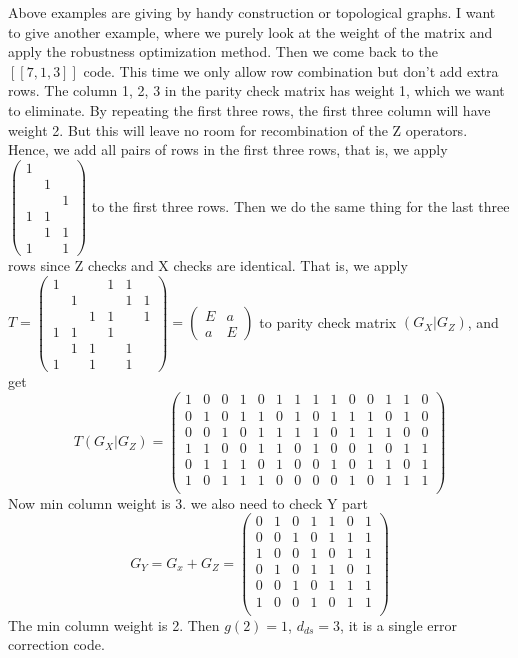 \documentclass[aps,prb,12pt,tightenlines,%
notitlepage,longbibliography]{revtex4-1}
\begin{document}
Above examples are giving by handy construction or topological graphs. I want to give another example, where we purely look at the weight of the matrix and apply the robustness optimization method. Then we come back to the $[[7,1,3]]$ code. This time we only allow row combination but  don't add extra rows. The column 1, 2, 3 in the parity check matrix has weight 1, which we want to eliminate. By repeating the first three rows, the first three column will have weight 2. But this will leave no room for recombination of the Z operators.
Hence, we add all pairs of rows in the first three rows, that is, we apply 
$\left( \begin{array}{ccc} 1\\&1\\&&1\\1&1\\&1&1\\1&&1 \end{array} \right)$ to the first three rows. Then we do the same thing for the last three rows since Z checks and X checks are identical. That is, we apply 
$T = \left( \begin{array}{ccc|ccc} 1&&&1&1\\&1&&&1&1\\&&1&1&&1\\1&1&&1\\&1&1&&1\\1&&1&&1 \end{array} \right) = \left( \begin{array}{cc} E & a \\a & E \end{array} \right)$ to parity check matrix $(G_X|G_Z)$, and get
$$T(G_X|G_Z)=\left(
\begin{array}{ccccccc|ccccccc}
1&0&0&1&0&1&1 &1&1&0&0&1&1&0\\
0&1&0&1&1&0&1 &0&1&1&1&0&1&0\\
0&0&1&0&1&1&1 &1&0&1&1&1&0&0\\
1&1&0&0&1&1&0 &1&0&0&1&0&1&1\\
0&1&1&1&0&1&0 &0&1&0&1&1&0&1\\
1&0&1&1&1&0&0 &0&0&1&0&1&1&1\\
\end{array}
\right)$$
Now min column weight is 3. we also need to check Y part
$$G_Y=G_x+G_Z=\left(\begin{array}{ccccccc}
0&1&0&1&1&0&1\\
0&0&1&0&1&1&1\\
1&0&0&1&0&1&1\\
0&1&0&1&1&0&1\\
0&0&1&0&1&1&1\\
1&0&0&1&0&1&1\\
\end{array}\right)$$
The min column weight is 2. Then $g(2)=1$, $d_{ds} =3$, it is a single error correction code.
\end{document}
